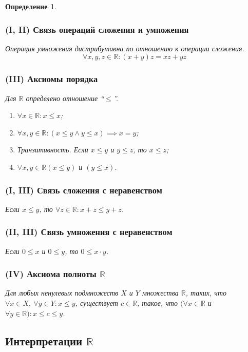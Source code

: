 \documentclass[a4paper,12pt]{article} %
\newtheorem{definition}{Определение}[section]
\theoremstyle{remark}
\theoremstyle{definition}
\begin{document}
\begin{definition}
	\subsubsection*{(I, II) Связь операций сложения и умножения}
	Операция умножения дистрибутивна по отношению к операции сложения.
		$$\forall x, y, z\in \mathbb{R}:(x+y)z=xz+yz$$
	\subsubsection*{(III) Аксиомы порядка}
	Для $\mathbb{R}$ определено отношение ``$\le $''.
		\begin{enumerate}
			\item $\forall x\in \mathbb{R}:x\le x$;
			\item $\forall x, y\in \mathbb{R}:(x\le y \land y\le x)\implies x=y$;
			\item Транзитивность. Если $x \le y$ и $y \le z$, то $x\le z$;
			\item $\forall x, y \in \mathbb{R} (x \le y)$ и $(y \le x)$.
		\end{enumerate}
	\subsubsection*{(I, III) Связь сложения с неравенством}
	Если $x \le  y$, то $\forall z \in  \mathbb{R} : x + z \le  y + z$.
	\subsubsection*{(II, III) Связь умножения с неравенством}
	Если $0 \le  x$ и $0 \le y$, то $0\le x \cdot y$.
	\subsubsection*{(IV) Аксиома полноты $\mathbb{R}$}
	Для любых ненулевых подмножеств $X$ и $Y$ множества $\mathbb{R}$, таких, что $\forall x\in X, \ \forall y\in Y : x \le y$, существует $c \in \mathbb{R}$, такое, что $(\forall x\in \mathbb{R}$ и $\forall y \in \mathbb{R}) : x \le  c \le  y$.

	
\end{definition}

\subsection{Интерпретации $\mathbb{R}$}
\end{document}
